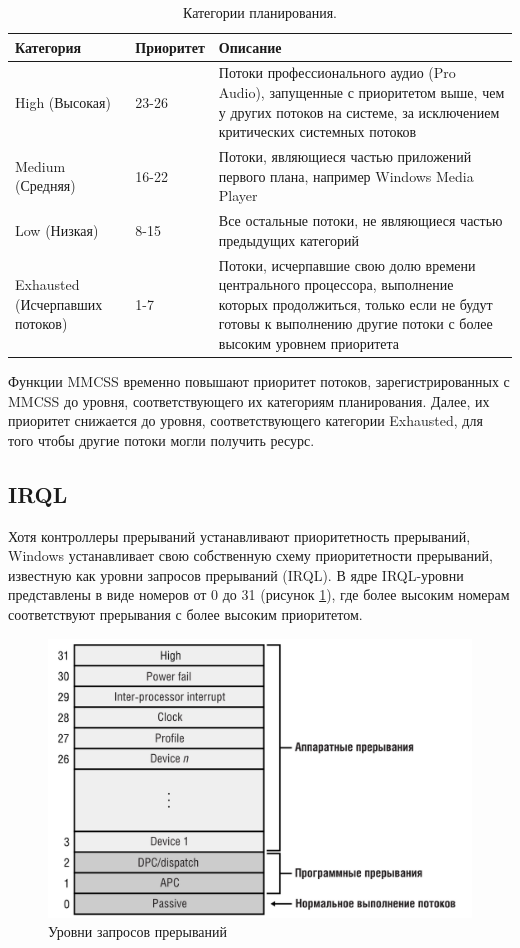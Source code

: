 \begin{table}[h!]
	\caption{Категории планирования.}
	\begin{center}
		\begin{tabular}{|p{40mm}|p{30mm}|p{80mm}|}
			\hline
			\textbf{Категория} & \textbf{Приоритет} & \textbf{Описание} \\
			\hline
			High (Высокая) & 23-26 & Потоки профессионального аудио (Pro Audio), запущенные с приоритетом выше, чем у других потоков на системе, за исключением критических системных потоков \\
			\hline
			Medium (Средняя) & 16-22 & Потоки, являющиеся частью приложений первого плана, например Windows Media Player \\
			\hline
			Low (Низкая) & 8-15 & Все остальные потоки, не являющиеся частью предыдущих категорий \\
			\hline
			Exhausted (Исчерпавших потоков) & 1-7 & Потоки, исчерпавшие свою долю времени центрального процессора, выполнение которых продолжиться, только если не будут готовы к выполнению другие потоки с более высоким уровнем приоритета \\
			\hline
		\end{tabular}
	\end{center}
	\label{tab:plan}
\end{table}

Функции MMCSS временно повышают приоритет потоков, зарегистрированных с MMCSS до уровня, соответствующего их категориям планирования. Далее, их приоритет снижается до уровня, соответствующего категории Exhausted, для того чтобы другие потоки могли получить ресурс.

\subsection*{IRQL}

Хотя контроллеры прерываний устанавливают приоритетность прерываний, Windows устанавливает свою собственную схему приоритетности прерываний, известную как уровни запросов прерываний (IRQL). В ядре IRQL-уровни представлены в виде номеров от 0 до 31 (рисунок \ref{fig:irql}), где более высоким номерам соответствуют прерывания с более высоким приоритетом.

\begin{figure}[h!]
	\centering
	\includegraphics[width=0.90\linewidth]{inc/img/irql.png}
	\caption{Уровни запросов прерываний}
	\label{fig:irql}
\end{figure}

